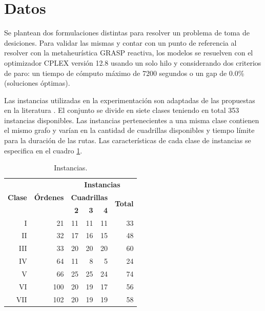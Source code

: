 \documentclass[preprint,12pt,authoryear]{elsarticle}
\begin{document}
\section{Datos}
\label{datos}

Se plantean dos formulaciones distintas para resolver un problema de toma de desiciones. Para validar las mismas y contar con un punto de referencia al resolver con la metaheurística GRASP reactiva, los modelos se resuelven con el optimizador CPLEX versión 12.8 usando un solo hilo y considerando dos criterios de paro: un tiempo de cómputo máximo de 7200 segundos o un gap de 0.0\% (soluciones óptimas). 

Las instancias utilizadas en la experimentación son adaptadas de las propuestas en la literatura \citep{chao1996}. El conjunto se divide en siete clases teniendo en total 353 instancias disponibles. Las instancias pertenecientes a una misma clase contienen el mismo grafo y varían en la cantidad de cuadrillas disponibles y tiempo límite para la duración de las rutas. Las características de cada clase de instancias se especifica en el cuadro \ref{instancias}.

\begin{table}
	\centering
	\caption{Instancias.}
	\begin{tabular}{|r|r|r|r|r|r|}
		\hline
		&  & \multicolumn{4}{c|}{\bf Instancias} \\
		\cline{3-6}
		\bf Clase & \bf Órdenes & \multicolumn{3}{c|}{\bf Cuadrillas} & \multirow{2}{1cm}{\bf Total} \\
		\cline{3-5}
		&  & \bf 2 & \bf 3 & \bf 4 & \\
		\hline
		I & 21 & 11 & 11 & 11 & 33 \\
		II & 32 & 17 & 16 & 15 & 48\\
		III & 33 & 20 & 20 & 20 & 60 \\
		IV & 64 & 11 & 8 & 5 & 24 \\
		V & 66 & 25 & 25 & 24 & 74 \\
		VI & 100 & 20 & 19 & 17 & 56 \\
		VII & 102 & 20 & 19 & 19 & 58 \\ 
		\hline
	\end{tabular}
	\label{instancias}
\end{table}

\end{document}
